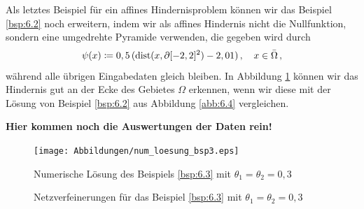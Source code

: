 \begin{bsp}\label{bsp:6.3}
Als letztes Beispiel für ein affines Hindernisproblem können wir das Beispiel \ref{bsp:6.2} noch erweitern, indem wir als affines Hindernis nicht die Nullfunktion, sondern eine umgedrehte Pyramide verwenden, die gegeben wird durch
\[
	\psi (x) \coloneqq 0,5 \,  (\operatorname{dist} (x,\partial [-2,2]^2)-2,01) \, , \quad x \in \bar \Omega \, ,
\]
während alle übrigen Eingabedaten gleich bleiben. In Abbildung \ref{abb:6.7} können wir das Hindernis gut an der Ecke des Gebietes $\Omega$ erkennen, wenn wir diese mit der Lösung von Beispiel \ref{bsp:6.2} aus Abbildung \ref{abb:6.4} vergleichen.

\textbf{Hier kommen noch die Auswertungen der Daten rein!}


\begin{figure}[h]
\begin{center}
\texttt{[image: Abbildungen/num\_loesung\_bsp3.eps]}
\end{center}
\caption{Numerische Lösung des Beispiels \ref{bsp:6.3} mit $\theta_1=\theta_2 = 0,3$\label{abb:6.7}}
\end{figure}


\begin{figure}[h]
\begin{center}
\hfill
{}
\end{center}
\caption{Netzverfeinerungen für das Beispiel \ref{bsp:6.3} mit $\theta_1=\theta_2=0,3$}
\end{figure}
\end{bsp}



